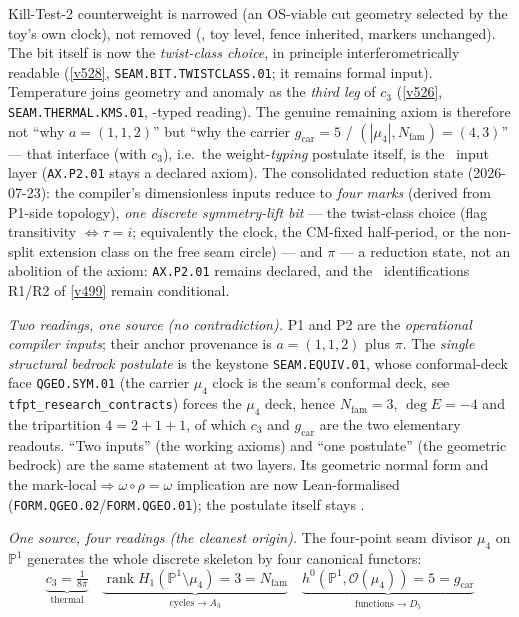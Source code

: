 \documentclass[11pt,a4paper]{article}
\newcommand{\cthree}{c_3}
\newcommand{\gcar}{g_{\mathrm{car}}}
\newcommand{\Nfam}{N_{\mathrm{fam}}}
\newcommand{\PP}{\mathbb{P}}
\begin{document}
Kill-Test-2 counterweight is narrowed (an OS-viable cut geometry selected by the toy's own
clock), not removed (, toy level, fence inherited,
markers unchanged). The bit itself is now the \emph{twist-class choice}, in principle
interferometrically readable (\vref{v528}, \texttt{SEAM.BIT.TWISTCLASS.01}; it remains formal
input). Temperature joins geometry and anomaly as the \emph{third leg} of $\cthree$
(\vref{v526}, \texttt{SEAM.THERMAL.KMS.01}, \mC-typed reading).
The genuine remaining axiom is therefore not ``why $a=(1,1,2)$'' but ``why the carrier
$\gcar=5$ / $(|\mu_4|,\Nfam)=(4,3)$'' --- that interface (with $\cthree$), i.e.\ the weight-\emph{typing}
postulate itself, is the \mO\ input layer (\texttt{AX.P2.01} stays a declared axiom). The consolidated
reduction state (2026-07-23): the compiler's dimensionless inputs reduce to \emph{four marks} (derived
from P1-side topology), \emph{one discrete symmetry-lift bit} --- the twist-class choice (flag
transitivity $\iff\tau=i$; equivalently the clock, the CM-fixed half-period, or the non-split
extension class on the free seam circle) --- and $\pi$ --- a reduction state, not an abolition of the axiom:
\texttt{AX.P2.01} remains declared, and the \mC\
identifications R1/R2 of \vref{v499} remain conditional.
\par\smallskip
\noindent\emph{Two readings, one source (no contradiction).} P1 and P2 are the \emph{operational compiler
inputs}; their anchor provenance is $a=(1,1,2)$ plus $\pi$. The \emph{single structural bedrock postulate}
is the keystone \texttt{SEAM.EQUIV.01}, whose conformal-deck face \texttt{QGEO.SYM.01} (the carrier $\mu_4$
clock is the seam's conformal deck, see
\texttt{tfpt\_research\_contracts}) forces the $\mu_4$ deck, hence $\Nfam=3$, $\deg E=-4$ and the
tripartition $4=2{+}1{+}1$, of which $c_3$ and $\gcar$ are the two elementary readouts. ``Two inputs''
(the working axioms) and ``one postulate'' (the geometric bedrock) are the same statement at two layers.
Its geometric normal form and the mark-local$\Rightarrow\omega\circ\rho=\omega$ implication are now
Lean-formalised (\texttt{FORM.QGEO.02}/\texttt{FORM.QGEO.01}); the postulate itself stays \mO.
\par\smallskip
\noindent\emph{One source, four readings (the cleanest origin).} The four-point seam divisor $\mu_4$ on
$\PP^1$ generates the whole discrete skeleton by four canonical functors:
\[
  \underbrace{\cthree=\tfrac1{8\pi}}_{\text{thermal}}
  \quad
  \underbrace{\operatorname{rank}H_1(\PP^1\!\setminus\!\mu_4)=3=\Nfam}_{\text{cycles}\to A_3}
  \quad
  \underbrace{h^0(\PP^1,\mathcal O(\mu_4))=5=\gcar}_{\text{functions}\to D_5}
\]
\end{document}
